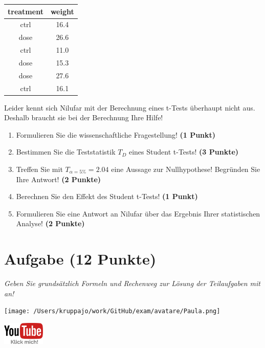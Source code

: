 \documentclass[a4paper, 9pt]{scrartcl}\usepackage[]{graphicx}\usepackage[]{xcolor}
\begin{document}
\begin{table}[!h]
\centering
\begin{tabular}{cc}
\toprule
treatment & weight\\
\midrule
ctrl & 16.4\\
dose & 26.6\\
ctrl & 11.0\\
dose & 15.3\\
dose & 27.6\\
\addlinespace
ctrl & 16.1\\
\bottomrule
\end{tabular}
\end{table}



Leider kennt sich Nilufar mit der Berechnung eines t-Tests überhaupt nicht aus. Deshalb braucht sie bei der Berechnung Ihre Hilfe!

\begin{enumerate}
  \item Formulieren Sie die wissenschaftliche Fragestellung! \textbf{(1 Punkt)}
  \item Bestimmen Sie die Teststatistik $T_{D}$ eines Student t-Tests! \textbf{(3 Punkte)}
  \item Treffen Sie mit $T_{\alpha = 5\%} = 2.04$ eine Aussage zur Nullhypothese! Begründen Sie Ihre Antwort! \textbf{(2 Punkte)}
  \item Berechnen Sie den Effekt des Student t-Tests! \textbf{(1 Punkt)}
  \item Formulieren Sie eine Antwort an Nilufar über das Ergebnis Ihrer statistischen Analyse! \textbf{(2 Punkte)}
\end{enumerate} 
\clearpage

\section{Aufgabe \hfill (12 Punkte)}

\textit{Geben Sie grundsätzlich Formeln und Rechenweg zur Lösung der Teilaufgaben mit an!} \\[1Ex]
 

 
\begin{minipage}[t]{0.5\textwidth}
\texttt{[image: /Users/kruppajo/work/GitHub/exam/avatare/Paula.png]}
\end{minipage}
\begin{minipage}[t]{0.5\textwidth}
\hfill
\href{https://youtu.be/Cq_rF_z4xOk}{\includegraphics[width = 2cm]{img/youtube}}
\end{minipage}
\vspace{-3ex}
\end{document}
